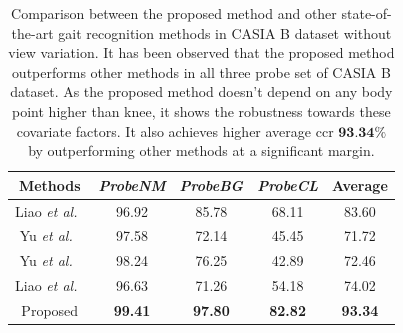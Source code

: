 \begin{table}[t]
	\centering
	\caption [Comparison between the proposed method and other state-of-the-art gait recognition methods in CASIA B dataset without view variation]
	{Comparison between the proposed method and other state-of-the-art gait recognition methods in CASIA B dataset without view variation. It has been observed that the proposed method outperforms other methods in all three probe set of CASIA B dataset. As the proposed method doesn't depend on any body point higher than knee, it shows the robustness towards these covariate factors. It also achieves higher average \gls{ccr} $\textbf{93.34\%}$ by outperforming other methods at a significant margin. \label{table:comp_casia_b_without_view}}
	
	{\begin{tabular*}{25pc}{ccccc}\hline
			
			Methods &\textit{ProbeNM} &\textit{ProbeBG} &\textit{ProbeCL} &Average\\
			\hline
			
			Liao \textit{et al.}~\cite{Liao_19} &96.92 &85.78 &68.11 &83.60 \\ 
			
			\noalign{\smallskip}
			Yu \textit{et al.}~\cite{Yu_17_spae}  &97.58  &72.14 &45.45 &71.72 \\
			
			\noalign{\smallskip}
			Yu \textit{et al.}~\cite{Yu_19} &98.24  &76.25  &42.89  &72.46 \\
			
			\noalign{\smallskip}
			Liao \textit{et al.}~\cite{Liao_19}  &96.63  &71.26  &54.18  &74.02 \\
			
			\noalign{\smallskip}
			Proposed &\textbf{99.41} &\textbf{97.80} &\textbf{82.82} &\textbf{93.34} \\
			\hline
	\end{tabular*}}{}
\end{table}

